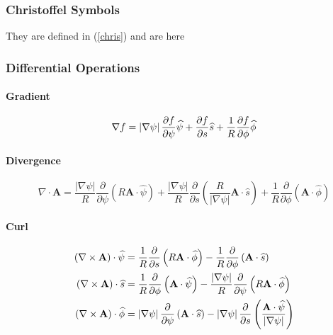 \subsubsection{Christoffel Symbols}

They are defined in (\ref{chris}) and are here

\subsubsection{Differential Operations}

\paragraph{Gradient}

\begin{equation}
\nabla f=\left| \nabla\psi\right| \frac{\partial f}{\partial\psi}\widehat{%
\psi}+\frac{\partial f}{\partial s}\widehat{s}+\frac{1}{R}\frac{\partial f}{%
\partial\phi}\widehat{\phi}  \label{psisgrad}
\end{equation}

\paragraph{Divergence}

\begin{equation}
\nabla\cdot\mathbf{A}=\frac{\left| \nabla\psi\right| }{R}\frac{\partial}{
\partial\psi}\left( R\mathbf{A}\cdot\widehat{\psi}\right) +\frac{\left|
\nabla\psi\right| }{R}\frac{\partial}{\partial s}\left( \frac{R}{\left|
\nabla\psi\right| }\mathbf{A}\cdot\widehat{s}\right) +\frac{1}{R}\frac{
\partial}{\partial\phi}\left( \mathbf{A}\cdot\widehat{\phi}\right)
\label{psisdiv}
\end{equation}

\paragraph{Curl}

\begin{align}
\left( \nabla\times\mathbf{A}\right) \cdot\widehat{\psi} & =\frac{1}{R}\frac{%
\partial}{\partial s}\left( R\mathbf{A}\cdot\widehat{\phi}\right) -\frac{1}{R%
}\frac{\partial}{\partial\phi}\left( \mathbf{A}\cdot\widehat {s}\right)
\label{curlpsis} \\
\left( \nabla\times\mathbf{A}\right) \cdot\widehat{s} & =\frac{1}{R}\frac{%
\partial}{\partial\phi}\left( \mathbf{A}\cdot\widehat{\psi}\right) -\frac{%
\left| \nabla\psi\right| }{R}\frac{\partial}{\partial\psi}\left( R\mathbf{A}%
\cdot\widehat{\phi}\right)  \notag \\
\left( \nabla\times\mathbf{A}\right) \cdot\widehat{\phi} & =\left|
\nabla\psi\right| \frac{\partial}{\partial\psi}\left( \mathbf{A}\cdot%
\widehat{s}\right) -\left| \nabla\psi\right| \frac{\partial}{\partial s}%
\left( \frac{\mathbf{A}\cdot\widehat{\psi}}{\left| \nabla\psi\right| }\right)
\notag
\end{align}

